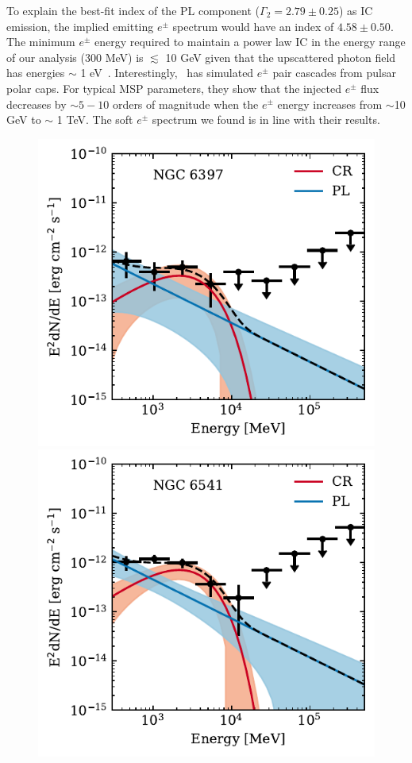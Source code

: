 \documentclass[doublespace,draft,nopageskip]{VTthesis} %
\begin{document}
To explain the best-fit index of the {PL} component ($\Gamma_2 = 2.79 \pm 0.25$) {as IC emission}, the implied emitting $e^\pm$ spectrum would have an index of $4.58 \pm 0.50$. The minimum $e^\pm$ energy required to maintain a power law IC in the energy range of our analysis (300 MeV) is $\lesssim$ 10 GeV given that the upscattered photon field has energies $\sim$ 1 eV~\citep{1970RvMP...42..237B}. Interestingly,~\citet{2011ApJ...743..181H} has simulated $e^{\pm}$ pair cascades from pulsar polar caps. For typical MSP parameters, they show that the injected $e^\pm$ flux decreases by $\sim 5 - 10$ orders of magnitude when the $e^\pm$ energy increases from $\sim$10 GeV to $\sim$ 1 TeV. The soft $e^\pm$ spectrum we found is in line with their results.

\begin{figure}
    \centering
    \includegraphics[width=1\columnwidth]{Figures/Globular/spectra/2comp_16.pdf}
    \includegraphics[width=1\columnwidth]{Figures/Globular/spectra/2comp_21.pdf}

\end{figure}
\end{document}
